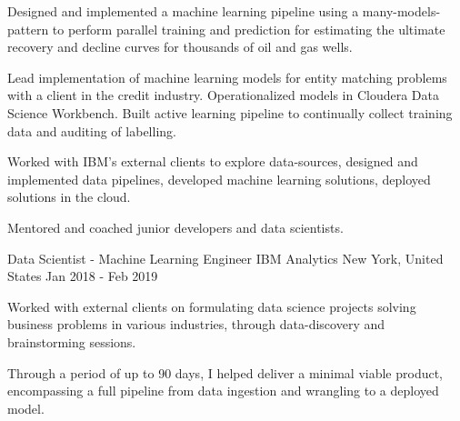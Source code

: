 \begin{cventries}
{\begin{cvitems}
        \item {Designed and implemented a machine learning pipeline using a many-models-pattern to perform parallel training and prediction for estimating the ultimate recovery and decline curves for thousands of oil and gas wells.}
        \item {Lead implementation of machine learning models for entity matching problems with a client in the credit industry. Operationalized models in Cloudera Data Science Workbench. Built active learning pipeline to continually collect training data and auditing of labelling. }
        \item {Worked with IBM's external clients to explore data-sources, designed and implemented data pipelines, developed machine learning solutions, deployed solutions in the cloud.}
        \item {Mentored and coached junior developers and data scientists.}
      \end{cvitems}
    }

  \cventry
    {Data Scientist - Machine Learning Engineer} %
    {IBM Analytics} %
    {New York, United States} %
    {Jan 2018 - Feb 2019} %
    {
      \begin{cvitems} %
        \item {Worked with external clients on formulating data science projects solving business problems in various industries, through data-discovery and brainstorming sessions.}
        \item {Through a period of up to 90 days, I helped deliver a minimal viable product, encompassing a full pipeline from data ingestion and wrangling to a deployed model.}
      \end{cvitems}
    }

\end{cventries}
